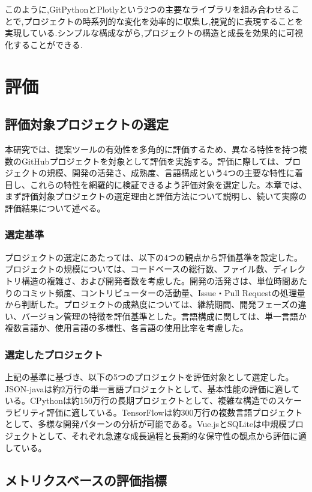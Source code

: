 \documentclass[12pt,twoside]{jbook}
\begin{document}
このように,GitPythonとPlotlyという2つの主要なライブラリを組み合わせることで,プロジェクトの時系列的な変化を効率的に収集し,視覚的に表現することを実現している.シンプルな構成ながら,プロジェクトの構造と成長を効果的に可視化することができる.

\chapter{評価}

\section{評価対象プロジェクトの選定}
本研究では、提案ツールの有効性を多角的に評価するため、異なる特性を持つ複数のGitHubプロジェクトを対象として評価を実施する。評価に際しては、プロジェクトの規模、開発の活発さ、成熟度、言語構成という4つの主要な特性に着目し、これらの特性を網羅的に検証できるよう評価対象を選定した。本章では、まず評価対象プロジェクトの選定理由と評価方法について説明し、続いて実際の評価結果について述べる。

\subsection{選定基準}
プロジェクトの選定にあたっては、以下の4つの観点から評価基準を設定した。プロジェクトの規模については、コードベースの総行数、ファイル数、ディレクトリ構造の複雑さ、および開発者数を考慮した。開発の活発さは、単位時間あたりのコミット頻度、コントリビューターの活動量、Issue・Pull Requestの処理量から判断した。プロジェクトの成熟度については、継続期間、開発フェーズの違い、バージョン管理の特徴を評価基準とした。言語構成に関しては、単一言語か複数言語か、使用言語の多様性、各言語の使用比率を考慮した。

\subsection{選定したプロジェクト}
上記の基準に基づき、以下の5つのプロジェクトを評価対象として選定した。JSON-javaは約2万行の単一言語プロジェクトとして、基本性能の評価に適している。CPythonは約150万行の長期プロジェクトとして、複雑な構造でのスケーラビリティ評価に適している。TensorFlowは約300万行の複数言語プロジェクトとして、多様な開発パターンの分析が可能である。Vue.jsとSQLiteは中規模プロジェクトとして、それぞれ急速な成長過程と長期的な保守性の観点から評価に適している。

\section{メトリクスベースの評価指標}
\end{document}
